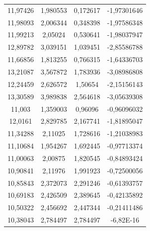 \documentclass[12pt]{article}
\begin{document}
\begin{minipage}{.5\textwidth}
\begin{tabular}{c|c|c|c|}
            11,97426 & 1,980553 & 0,172617 & -1,97301646 \\ 
            11,98093 & 2,006344 & 0,348398 & -1,97586348 \\ 
            11,99213 & 2,05024 & 0,530641 & -1,98037947 \\ 
            12,89782 & 3,039151 & 1,039451 & -2,85586788 \\ 
            11,66856 & 1,813255 & 0,766315 & -1,64336703 \\ 
            13,21087 & 3,567872 & 1,783936 & -3,08986808 \\ 
            12,24459 & 2,626572 & 1,50654 & -2,15156143 \\ 
            13,30589 & 3,989838 & 2,564618 & -3,05639308 \\ 
            11,003 & 1,359003 & 0,96096 & -0,96096032 \\ 
            12,0161 & 2,829785 & 2,167741 & -1,81895047 \\ 
            11,34288 & 2,11025 & 1,728616 & -1,21038983 \\ 
            11,10684 & 1,954267 & 1,692445 & -0,97713374 \\ 
            11,00063 & 2,00875 & 1,820545 & -0,84893424 \\ 
            10,90841 & 2,11976 & 1,991923 & -0,72500056 \\ 
            10,85843 & 2,372073 & 2,291246 & -0,61393757 \\ 
            10,69183 & 2,426509 & 2,389645 & -0,42135892 \\ 
            10,50322 & 2,456692 & 2,447344 & -0,21411486 \\ 
            10,38043 & 2,784497 & 2,784497 & -6,82E-16 \\
        \end{tabular}
    \end{minipage}
\end{document}

